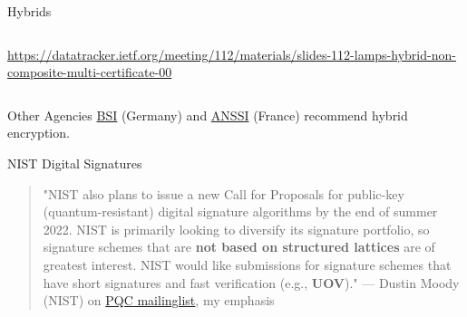 \documentclass[xcolor=table,10pt,aspectratio=169]{beamer}
\begin{document}
\begin{frame}[label={sec:orge7fefda}]{Hybrids}
\begin{columns}[t]
\begin{column}{0.7\columnwidth}
\tiny \url{https://datatracker.ietf.org/meeting/112/materials/slides-112-lamps-hybrid-non-composite-multi-certificate-00}
\end{column}
\end{columns}

\begin{alertblock}{Other Agencies}
\href{https://www.bsi.bund.de/EN/Themen/Unternehmen-und-Organisationen/Informationen-und-Empfehlungen/Quantentechnologien-und-Post-Quanten-Kryptografie/quantentechnologien-und-post-quanten-kryptografie\_node.html}{BSI} (Germany) and \href{https://www.ssi.gouv.fr/en/publication/anssi-views-on-the-post-quantum-cryptography-transition/}{ANSSI} (France) recommend hybrid encryption.
\end{alertblock}
\end{frame}
\begin{frame}[label={sec:orga53e988}]{NIST Digital Signatures}
\begin{quote}
"NIST also plans to issue a new Call for Proposals for public-key (quantum-resistant) digital signature algorithms by the end of summer 2022. NIST is primarily looking to diversify its signature portfolio, so signature schemes that are \textbf{not based on structured lattices} are of greatest interest. NIST would like submissions for signature schemes that have short signatures and fast verification (e.g., \textbf{UOV})." --- Dustin Moody (NIST) on \href{https://groups.google.com/a/list.nist.gov/g/pqc-forum/c/G0DoD7lkGPk/m/f3Hl0sh3AgAJ}{PQC mailinglist}, my emphasis
\end{quote}
\end{frame}
\end{document}
